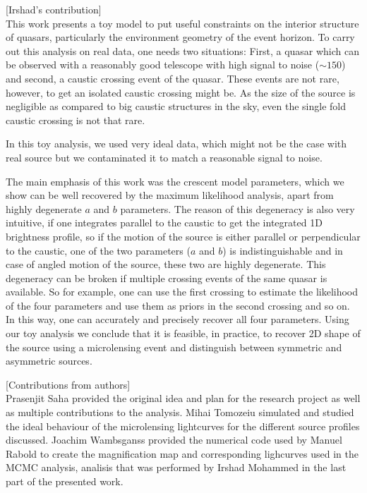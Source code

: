               

[Irshad's contribution]\\

This work presents a toy model to put useful constraints on the interior structure of quasars, particularly the environment geometry of the event horizon. To carry out this analysis on real data, one needs two situations: First, a quasar which can be observed with a reasonably good telescope with high signal to noise ($\sim 150$) and second, a caustic crossing event of the quasar. These events are not rare, however, to get an isolated caustic crossing might be. As the size of the source is negligible as compared to big caustic structures in the sky, even the single fold caustic crossing is not that rare.

In this toy analysis, we used very ideal data, which might not be the case with real source but we contaminated it to match a reasonable signal to noise. 

The main emphasis of this work was the crescent model parameters, which we show can be well recovered by the maximum likelihood analysis, apart from highly degenerate $a$ and $b$ parameters. The reason of this degeneracy is also very intuitive, if one integrates parallel to the caustic to get the integrated 1D brightness profile, so if the motion of the source is either parallel or perpendicular to the caustic, one of the two parameters ($a$ and $b$) is indistinguishable and in case of angled motion of the source, these two are highly degenerate. This degeneracy can be broken if multiple crossing events of the same quasar is available. So for example, one can use the first crossing to estimate the likelihood of the four parameters and use them as priors in the second crossing and so on. In this way, one can accurately and precisely recover all four parameters. Using our toy analysis we conclude that it is feasible, in practice, to recover 2D shape of the source using a microlensing event and distinguish between symmetric and asymmetric sources.



[Contributions from authors]\\
Prasenjit Saha provided the original idea and plan for the research project as well as multiple contributions to the analysis. Mihai Tomozeiu simulated and studied the ideal behaviour of the microlensing lightcurves for the different source profiles discussed. Joachim Wambsganss provided the numerical code used by Manuel Rabold to create the magnification map and corresponding lighcurves used in the MCMC analysis, analisis that was performed by Irshad Mohammed in the last part of the presented work. 
